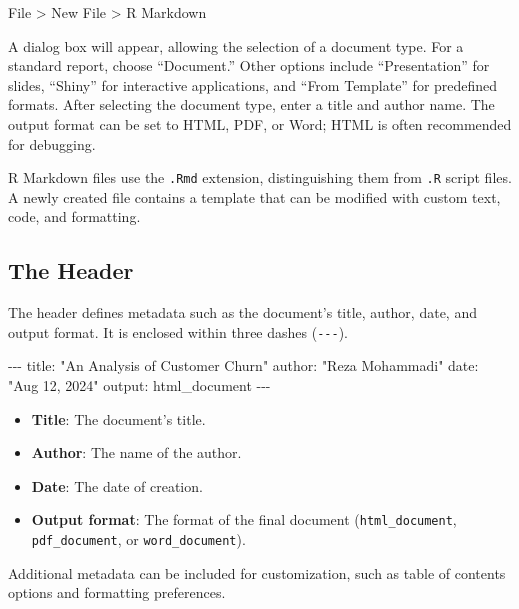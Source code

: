 \documentclass[
  11pt,
]{book}
\makeatletter
\newenvironment{Shaded}{}{}
\newcommand{\AttributeTok}[1]{#1}
\newcommand{\FunctionTok}[1]{#1}
\newcommand{\KeywordTok}[1]{\textcolor[rgb]{0.07,0.07,0.07}{#1}}
\newcommand{\PreprocessorTok}[1]{\textcolor[rgb]{0.39,0.39,0.39}{#1}}
\newcommand{\StringTok}[1]{\textcolor[rgb]{0.39,0.39,0.39}{#1}}
\providecommand{\tightlist}{%
  \setlength{\itemsep}{0pt}\setlength{\parskip}{0pt}}
\newenvironment{kframe}{%
\medskip{}
\setlength{\fboxsep}{.8em}
 \def\at@end@of@kframe{}%
 \ifinner\ifhmode%
  \def\at@end@of@kframe{\end{minipage}}%
  \begin{minipage}{\columnwidth}%
 \fi\fi%
 \def\FrameCommand##1{\hskip\@totalleftmargin \hskip-\fboxsep
 \colorbox{shadecolor}{##1}\hskip-\fboxsep
     \hskip-\linewidth \hskip-\@totalleftmargin \hskip\columnwidth}%
 \MakeFramed {\advance\hsize-\width
   \@totalleftmargin\z@ \linewidth\hsize
   \@setminipage}}%
 {\par\unskip\endMakeFramed%
 \at@end@of@kframe}
\renewenvironment{Shaded}{\begin{kframe}}{\end{kframe}}
\theoremstyle{definition}
\theoremstyle{definition}
\theoremstyle{definition}
\theoremstyle{definition}
\theoremstyle{remark}
\makeatother
\begin{document}
File \textgreater{} New File \textgreater{} R Markdown

A dialog box will appear, allowing the selection of a document type. For a standard report, choose ``Document.'' Other options include ``Presentation'' for slides, ``Shiny'' for interactive applications, and ``From Template'' for predefined formats. After selecting the document type, enter a title and author name. The output format can be set to HTML, PDF, or Word; HTML is often recommended for debugging.

R Markdown files use the \texttt{.Rmd} extension, distinguishing them from \texttt{.R} script files. A newly created file contains a template that can be modified with custom text, code, and formatting.

\subsection*{The Header}\label{the-header}


The header defines metadata such as the document's title, author, date, and output format. It is enclosed within three dashes (\texttt{-\/-\/-}).

\begin{Shaded}
\begin{Highlighting}[]
\PreprocessorTok{{-}{-}{-}}
\FunctionTok{title}\KeywordTok{:}\AttributeTok{ }\StringTok{"An Analysis of Customer Churn"}
\FunctionTok{author}\KeywordTok{:}\AttributeTok{ }\StringTok{"Reza Mohammadi"}
\FunctionTok{date}\KeywordTok{:}\AttributeTok{ }\StringTok{"Aug 12, 2024"}
\FunctionTok{output}\KeywordTok{:}\AttributeTok{ html\_document}
\PreprocessorTok{{-}{-}{-}}
\end{Highlighting}
\end{Shaded}

\begin{itemize}
\tightlist
\item
  \textbf{Title}: The document's title.\\
\item
  \textbf{Author}: The name of the author.\\
\item
  \textbf{Date}: The date of creation.\\
\item
  \textbf{Output format}: The format of the final document (\texttt{html\_document}, \texttt{pdf\_document}, or \texttt{word\_document}).
\end{itemize}

Additional metadata can be included for customization, such as table of contents options and formatting preferences.
\end{document}
